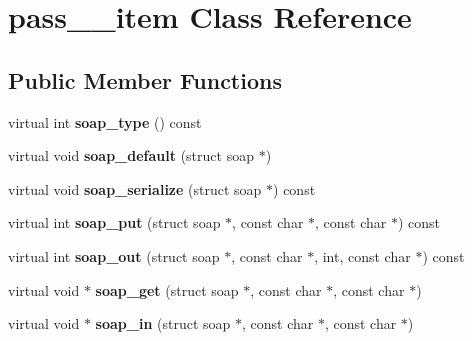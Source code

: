 \hypertarget{classpass____item}{
\section{pass\_\-\_\-item Class Reference}
\label{classpass____item}
}
\subsection*{Public Member Functions}
\begin{DoxyCompactItemize}
\item 
\hypertarget{classpass____item_af6e3ae6bac083bb0736c9161c82473e6}{
virtual int {\bfseries soap\_\-type} () const }
\label{classpass____item_af6e3ae6bac083bb0736c9161c82473e6}

\item 
\hypertarget{classpass____item_ab6e312e333918b39694d821f9282de59}{
virtual void {\bfseries soap\_\-default} (struct soap $\ast$)}
\label{classpass____item_ab6e312e333918b39694d821f9282de59}

\item 
\hypertarget{classpass____item_afb5ff319686feb33f6ea69b93474f165}{
virtual void {\bfseries soap\_\-serialize} (struct soap $\ast$) const }
\label{classpass____item_afb5ff319686feb33f6ea69b93474f165}

\item 
\hypertarget{classpass____item_a07875893849cda25bfc25840747a31eb}{
virtual int {\bfseries soap\_\-put} (struct soap $\ast$, const char $\ast$, const char $\ast$) const }
\label{classpass____item_a07875893849cda25bfc25840747a31eb}

\item 
\hypertarget{classpass____item_a20ff27a1eb3b3777d2598e9daa8dfe6b}{
virtual int {\bfseries soap\_\-out} (struct soap $\ast$, const char $\ast$, int, const char $\ast$) const }
\label{classpass____item_a20ff27a1eb3b3777d2598e9daa8dfe6b}

\item 
\hypertarget{classpass____item_acf8624ec3683da5e05a728c370acc740}{
virtual void $\ast$ {\bfseries soap\_\-get} (struct soap $\ast$, const char $\ast$, const char $\ast$)}
\label{classpass____item_acf8624ec3683da5e05a728c370acc740}

\item 
\hypertarget{classpass____item_a42c9dd0a9013481a24f1d485cdb6d57f}{
virtual void $\ast$ {\bfseries soap\_\-in} (struct soap $\ast$, const char $\ast$, const char $\ast$)}
\label{classpass____item_a42c9dd0a9013481a24f1d485cdb6d57f}

\end{DoxyCompactItemize}
